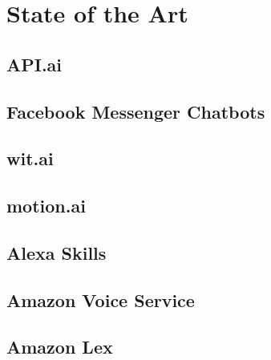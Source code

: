 




\section{State of the Art}

\subsection{API.ai}

\subsection{Facebook Messenger Chatbots}
\subsection{wit.ai}
\subsection{motion.ai}

\subsection{Alexa Skills}
\subsection{Amazon Voice Service}

\subsection{Amazon Lex}

